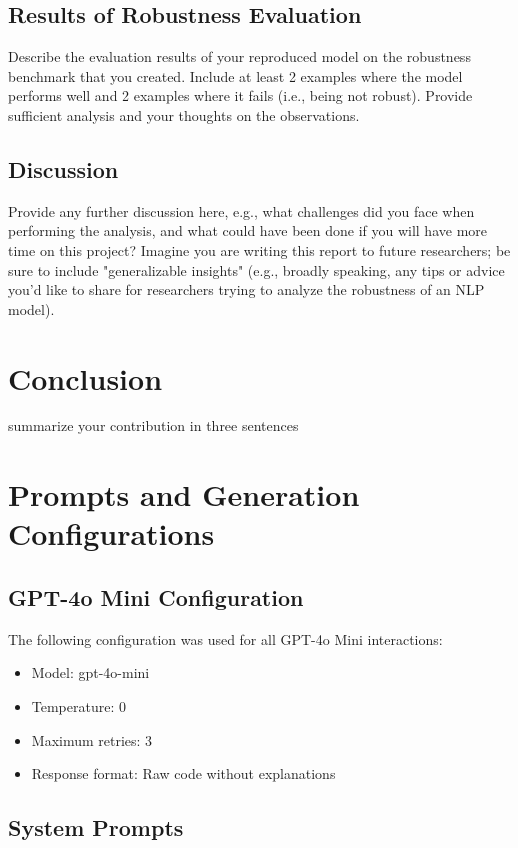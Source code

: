 \documentclass[11pt,a4paper]{article}
\begin{document}
\subsection{Results of Robustness Evaluation}
Describe the evaluation results of your reproduced model on the robustness benchmark that you created. Include at least 2 examples where the model performs well and 2 examples where it fails (i.e., being not robust). Provide sufficient analysis and your thoughts on the observations.

\subsection{Discussion} 
Provide any further discussion here, e.g., what challenges did you face when performing the analysis, and what could have been done if you will have more time on this project? Imagine you are writing this report to future researchers; be sure to include "generalizable insights" (e.g., broadly speaking, any tips or advice you'd like to share for researchers trying to analyze the robustness of an NLP model).

\section{Conclusion}
summarize your contribution in three sentences
\appendix
\label{sec:appendix}
\section{Prompts and Generation Configurations}

\subsection{GPT-4o Mini Configuration}
The following configuration was used for all GPT-4o Mini interactions:

\begin{itemize}
    \item Model: gpt-4o-mini
    \item Temperature: 0
    \item Maximum retries: 3
    \item Response format: Raw code without explanations
\end{itemize}

\subsection{System Prompts}
\end{document}
